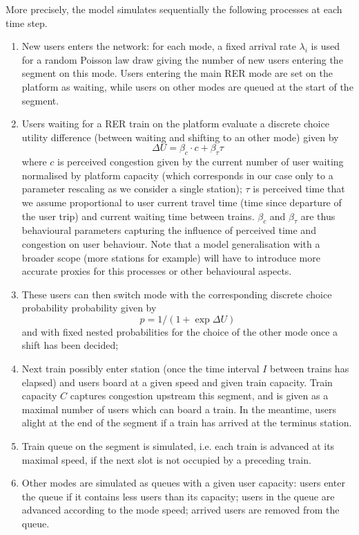 \documentclass[10pt]{article}
\begin{document}
More precisely, the model simulates sequentially the following processes at each time step.

\begin{enumerate}
	\item New users enters the network: for each mode, a fixed arrival rate $\lambda_i$ is used for a random Poisson law draw giving the number of new users entering the segment on this mode. Users entering the main RER mode are set on the platform as waiting, while users on other modes are queued at the start of the segment.
	\item Users waiting for a RER train on the platform evaluate a discrete choice utility difference (between waiting and shifting to an other mode) given by 
	\begin{equation} 
	\Delta U = \beta_c \cdot c + \beta_{\tau} \tau
	\end{equation}
	where $c$ is perceived congestion given by the current number of user waiting normalised by platform capacity (which corresponds in our case only to a parameter rescaling as we consider a single station); $\tau$ is perceived time that we assume proportional to user current travel time (time since departure of the user trip) and current waiting time between trains. $\beta_c$ and $\beta_{\tau}$ are thus behavioural parameters capturing the influence of perceived time and congestion on user behaviour. Note that a model generalisation with a broader scope (more stations for example) will have to introduce more accurate proxies for this processes or other behavioural aspects.
	\item These users can then switch mode with the corresponding discrete choice probability probability given by 
	\begin{equation}
	p = 1 / (1 + \exp \Delta U)
	\end{equation}
	and with fixed nested probabilities for the choice of the other mode once a shift has been decided;
	\item Next train possibly enter station (once the time interval $I$ between trains has elapsed) and users board at a given speed and given train capacity. Train capacity $C$ captures congestion upstream this segment, and is given as a maximal number of users which can board a train. In the meantime, users alight at the end of the segment if a train has arrived at the terminus station.
	\item Train queue on the segment is simulated, i.e. each train is advanced at its maximal speed, if the next slot is not occupied by a preceding train.
	\item Other modes are simulated as queues with a given user capacity: users enter the queue if it contains less users than its capacity; users in the queue are advanced according to the mode speed; arrived users are removed from the queue.
\end{enumerate}
\end{document}
